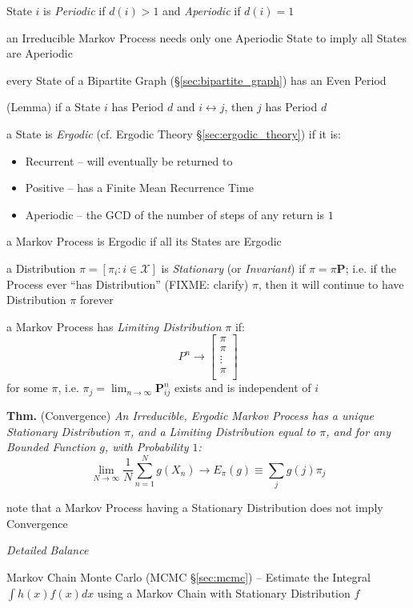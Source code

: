 State $i$ is \emph{Periodic} if $d(i) > 1$ and \emph{Aperiodic} if $d(i) = 1$

an Irreducible Markov Process needs only one Aperiodic State to imply all States
are Aperiodic

every State of a Bipartite Graph (\S\ref{sec:bipartite_graph}) has an Even
Period

(Lemma) if a State $i$ has Period $d$ and $i \leftrightarrow j$, then $j$ has
Period $d$

a State is \emph{Ergodic} (cf. Ergodic Theory \S\ref{sec:ergodic_theory}) if it
is:
\begin{itemize}
  \item Recurrent -- will eventually be returned to
  \item Positive -- has a Finite Mean Recurrence Time
  \item Aperiodic -- the GCD of the number of steps of any return is $1$
\end{itemize}
a Markov Process is Ergodic if all its States are Ergodic

a Distribution $\pi = [\pi_i : i \in \mathcal{X}]$ is \emph{Stationary} (or
\emph{Invariant}) if $\pi = \pi \mathbf{P}$; i.e. if the Process ever ``has
Distribution'' (FIXME: clarify) $\pi$, then it will continue to have
Distribution $\pi$ forever

a Markov Process has \emph{Limiting Distribution} $\pi$ if:
\[
  P^n \rightarrow \begin{bmatrix}
    \pi \\
    \pi \\
    \vdots \\
    \pi \\
  \end{bmatrix}
\]
for some $\pi$, i.e. $\pi_j = \lim_{n\rightarrow\infty} \mathbf{P}_{ij}^n$
exists and is independent of $i$

\textbf{Thm.} (Convergence) \emph{
  An Irreducible, Ergodic Markov Process has a
  unique Stationary Distribution $\pi$, and a Limiting Distribution equal to
  $\pi$, and for any Bounded Function $g$, with Probability $1$:
\[
  \lim_{N\rightarrow\infty} \frac{1}{N} \sum_{n=1}^N g(X_n)
    \rightarrow E_\pi(g) \equiv \sum_j g(j) \pi_j
\]
}

note that a Markov Process having a Stationary Distribution does not imply
Convergence

\emph{Detailed Balance}

\fist Markov Chain Monte Carlo (MCMC \S\ref{sec:mcmc}) -- Estimate the Integral
$\int h(x) f(x) dx$ using a Markov Chain with Stationary Distribution $f$



